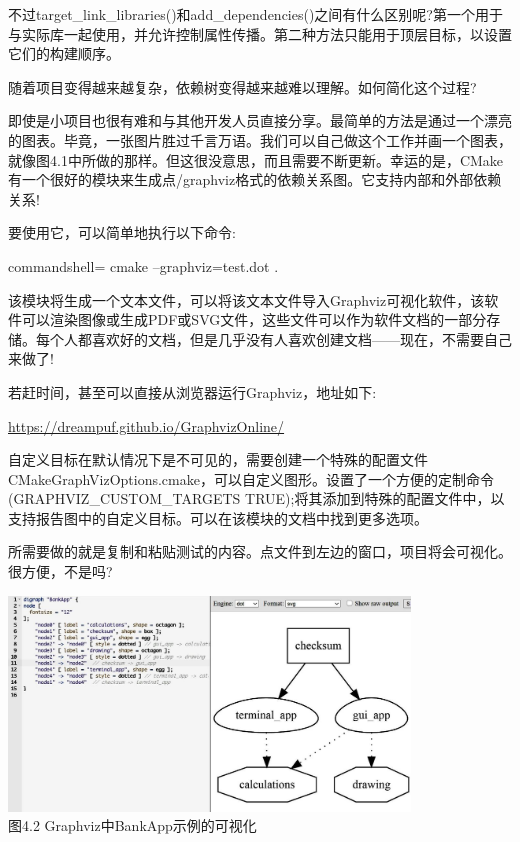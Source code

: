 不过target\_link\_libraries()和add\_dependencies()之间有什么区别呢?第一个用于与实际库一起使用，并允许控制属性传播。第二种方法只能用于顶层目标，以设置它们的构建顺序。

随着项目变得越来越复杂，依赖树变得越来越难以理解。如何简化这个过程?


即使是小项目也很有难和与其他开发人员直接分享。最简单的方法是通过一个漂亮的图表。毕竟，一张图片胜过千言万语。我们可以自己做这个工作并画一个图表，就像图4.1中所做的那样。但这很没意思，而且需要不断更新。幸运的是，CMake有一个很好的模块来生成点/graphviz格式的依赖关系图。它支持内部和外部依赖关系!

要使用它，可以简单地执行以下命令:

\begin{tcblisting}{commandshell={}}
cmake --graphviz=test.dot .
\end{tcblisting}

该模块将生成一个文本文件，可以将该文本文件导入Graphviz可视化软件，该软件可以渲染图像或生成PDF或SVG文件，这些文件可以作为软件文档的一部分存储。每个人都喜欢好的文档，但是几乎没有人喜欢创建文档——现在，不需要自己来做了!

若赶时间，甚至可以直接从浏览器运行Graphviz，地址如下:

\url{https://dreampuf.github.io/GraphvizOnline/}

\begin{tcolorbox}[colback=blue!5!white,colframe=blue!75!black,title=重要的Note]
自定义目标在默认情况下是不可见的，需要创建一个特殊的配置文件CMakeGraphVizOptions.cmake，可以自定义图形。设置了一个方便的定制命令(GRAPHVIZ\_CUSTOM\_TARGETS TRUE);将其添加到特殊的配置文件中，以支持报告图中的自定义目标。可以在该模块的文档中找到更多选项。
\end{tcolorbox}

所需要做的就是复制和粘贴测试的内容。点文件到左边的窗口，项目将会可视化。很方便，不是吗?

\begin{center}
\includegraphics[width=0.8\textwidth]{content/2/chapter4/images/2.jpg}\\
图4.2  Graphviz中BankApp示例的可视化
\end{center}

